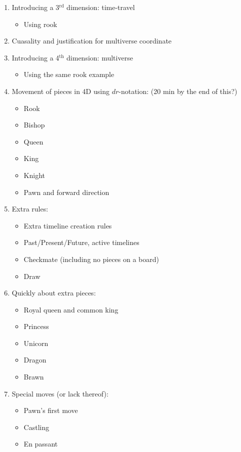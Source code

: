 \begin{enumerate}
	\item Introducing a 3$^{\text{rd}}$ dimension: time-travel
		\begin{itemize}
			\item Using rook
		\end{itemize}
	\item Cuasality and justification for multiverse coordinate
	\item Introducing a 4$^{\text{th}}$ dimension: multiverse
		\begin{itemize}
			\item Using the same rook example
		\end{itemize}
	\item Movement of pieces in 4D using $dr$-notation: (20 min by the end of this?)
        \begin{itemize}
	        \item Rook
	        \item Bishop
	        \item Queen
	        \item King
	        \item Knight
			\item Pawn and forward direction
	    \end{itemize}
	\item Extra rules:
		\begin{itemize}
			\item Extra timeline creation rules
			\item Past/Present/Future, active timelines
			\item Checkmate (including no pieces on a board)
			\item Draw
		\end{itemize}
	\item Quickly about extra pieces:
        \begin{itemize}
	        \item Royal queen and common king
	        \item Princess
	        \item Unicorn
	        \item Dragon
	        \item Brawn
	    \end{itemize}
	\item Special moves (or lack thereof):
        \begin{itemize}
	        \item Pawn's first move
	        \item Castling
	        \item En passant

\end{itemize}
\end{enumerate}
